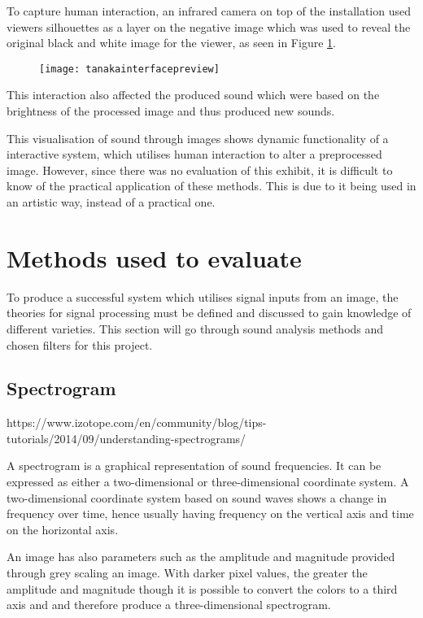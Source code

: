 To capture human interaction, an infrared camera on top of the installation used viewers silhouettes as a layer on the negative image which was used to reveal the original black and white image for the viewer, as seen in Figure \ref{fig:tanakainterfacepreview}.

\begin{figure}[!h]
\centering
\texttt{[image: tanakainterfacepreview]}
\caption{\label{fig:tanakainterfacepreview}\cite{Tanaka2012}}
\end{figure}

This interaction also affected the produced sound which were based on the brightness of the processed image and thus produced new sounds. 

This visualisation of sound through images shows dynamic functionality of a interactive system, which utilises human interaction to alter a preprocessed image. However, since there was no evaluation of this exhibit, it is difficult to know of the practical application of these methods. This is due to it being used in an artistic way, instead of a practical one.   

\section{Methods used to evaluate}\label{sec:methodsusedtoevaluate}

To produce a successful system which utilises signal inputs from an image, the theories for signal processing must be defined and discussed to gain knowledge of different varieties. This section will go through sound analysis methods and chosen filters for this project. 

\subsection{Spectrogram}\label{sub:spectrogram}

https://www.izotope.com/en/community/blog/tips-tutorials/2014/09/understanding-spectrograms/

A spectrogram is a graphical representation of sound frequencies. It can be expressed as either a two-dimensional or three-dimensional coordinate system. A two-dimensional coordinate system based on sound waves shows a change in frequency over time, hence usually having frequency on the vertical axis and time on the horizontal axis. 

An image has also parameters such as the amplitude and magnitude provided through grey scaling an image.  With darker pixel values, the greater the amplitude and magnitude though it is possible to convert the colors to a third axis and and therefore produce a three-dimensional spectrogram.

